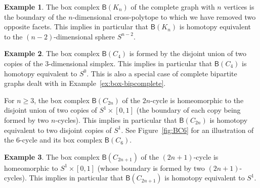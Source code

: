 \documentclass[12pt]{amsart}
\theoremstyle{definition}
\newtheorem{example}{Example}
\def\B{\mathsf{B}}
\renewcommand{\geq}{\geqslant}
\begin{document}
\begin{example}\label{ex:box-complete}
The box complex $\B(K_n)$ of the complete graph with $n$ vertices is the boundary of the $n$-dimensional cross-polytope to which we have removed two opposite facets. This implies in particular that $\B(K_n)$ is homotopy equivalent to the $(n-2)$-dimensional sphere $S^{n-2}$.
\end{example}

\begin{example}\label{ex:box-C2n}
    The box complex $\B(C_4)$ is formed by the disjoint union of two copies of the $3$-dimensional simplex. This implies in particular that $\B(C_4)$ is homotopy equivalent to $S^0$. This is also a special case of complete bipartite graphs dealt with in Example~\ref{ex:box-bipcomplete}.

    For $n\geq 3$, the box complex $\B(C_{2n})$ of the $2n$-cycle is homeomorphic to the disjoint union of two copies of $S^1 \times [0,1]$ (the boundary of each copy being formed by two $n$-cycles).  This implies in particular that $\B(C_{2n})$ is homotopy equivalent to two disjoint copies of $S^1$. See Figure~\ref{fig:BC6} for an illustration of the $6$-cycle and its box complex $\B(C_6)$.
\end{example}


\begin{example}\label{ex:box-C2n+1}
    The box complex $\B(C_{2n+1})$ of the $(2n+1)$-cycle is homeomorphic to $S^1 \times [0,1]$ (whose boundary is formed by two $(2n+1)$-cycles).  This implies in particular that $\B(C_{2n+1})$ is homotopy equivalent to $S^1$.
\end{example}
\end{document}
